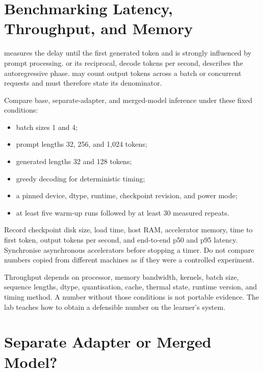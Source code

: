 \section{Benchmarking Latency, Throughput, and Memory}

 measures the delay until the first generated
token and is strongly influenced by prompt processing.
 or its reciprocal, decode tokens per second,
describes the autoregressive phase.
 may count output tokens across a batch or concurrent
requests and must therefore state its denominator.

\begin{practicallab}
Compare base, separate-adapter, and merged-model inference under these fixed
conditions:
\begin{itemize}
    \item batch sizes 1 and 4;
    \item prompt lengths 32, 256, and 1,024 tokens;
    \item generated lengths 32 and 128 tokens;
    \item greedy decoding for deterministic timing;
    \item a pinned device, dtype, runtime, checkpoint revision, and power mode;
    \item at least five warm-up runs followed by at least 30 measured repeats.
\end{itemize}

Record checkpoint disk size, load time, host RAM, accelerator memory, time to
first token, output tokens per second, and end-to-end p50 and p95 latency.
Synchronise asynchronous accelerators before stopping a timer.
Do not compare numbers copied from different machines as if they were a
controlled experiment.
\end{practicallab}

\begin{cautionbox}
Throughput depends on processor, memory bandwidth, kernels, batch size,
sequence lengths, dtype, quantisation, cache, thermal state, runtime version,
and timing method.
A number without those conditions is not portable evidence.
The lab teaches how to obtain a defensible number on the learner's system.
\end{cautionbox}

\section{Separate Adapter or Merged Model?}

